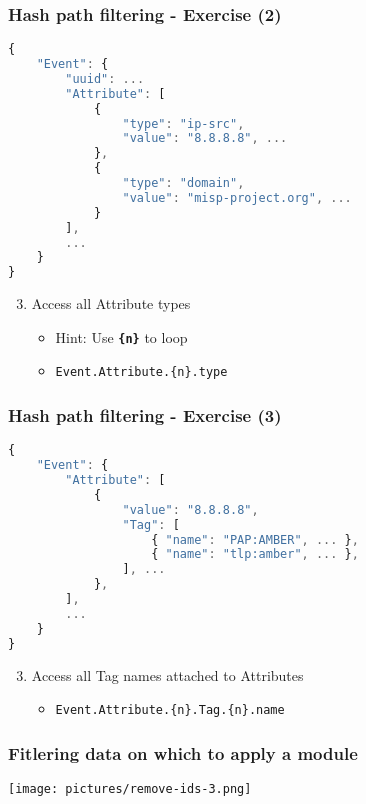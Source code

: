 \begin{frame}[fragile]
    \frametitle{Hash path filtering - Exercise (2)}

\begin{lstlisting}[language=javascript,firstnumber=1]
{
    "Event": {
        "uuid": ...
        "Attribute": [
            {
                "type": "ip-src",
                "value": "8.8.8.8", ...
            },
            {
                "type": "domain",
                "value": "misp-project.org", ...
            }
        ],
        ...
    }
}
\end{lstlisting}
    \begin{enumerate}
        \setcounter{enumi}{2}
        \item Access all Attribute types
        \begin{itemize}
            \item Hint: Use \texttt{\bf \{n\}} to loop 
            \pause
            \item \texttt{Event.Attribute.\{n\}.type}
        \end{itemize}
    \end{enumerate}
\end{frame}

\begin{frame}[fragile]
    \frametitle{Hash path filtering - Exercise (3)}

\begin{lstlisting}[language=javascript,firstnumber=1]
{
    "Event": {
        "Attribute": [
            {
                "value": "8.8.8.8",
                "Tag": [
                    { "name": "PAP:AMBER", ... },
                    { "name": "tlp:amber", ... },
                ], ...
            },
        ],
        ...
    }
}
\end{lstlisting}
    \begin{enumerate}
        \setcounter{enumi}{2}
        \item Access all Tag names attached to Attributes
        \pause
        \begin{itemize}
            \item \texttt{Event.Attribute.\{n\}.Tag.\{n\}.name}
        \end{itemize}
    \end{enumerate}
\end{frame}

\begin{frame}
    \frametitle{Fitlering data on which to apply a module}
    \begin{center}
        \texttt{[image: pictures/remove-ids-3.png]}
    \end{center}
\end{frame}


